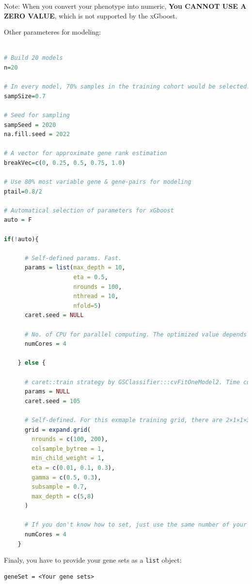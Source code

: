 \documentclass[
  12pt,
]{book}
\newcommand{\passthrough}[1]{#1}
\begin{document}
Note: When you convert your phenotype into numeric, \textbf{You CANNOT USE A ZERO VALUE}, which is not supported by the xGboost.

Other parameteres for modeling:

\begin{lstlisting}[language=R]

# Build 20 models
n=20 

# In every model, 70% samples in the training cohort would be selected. 
sampSize=0.7

# Seed for sampling
sampSeed = 2020
na.fill.seed = 2022

# A vector for approximate gene rank estimation
breakVec=c(0, 0.25, 0.5, 0.75, 1.0)
  
# Use 80% most variable gene & gene-pairs for modeling
ptail=0.8/2

# Automatical selection of parameters for xGboost
auto = F

if(!auto){
      
      # Self-defined params. Fast.
      params = list(max_depth = 10,
                    eta = 0.5,
                    nrounds = 100,
                    nthread = 10,
                    nfold=5)
      caret.seed = NULL
      
      # No. of CPU for parallel computing. The optimized value depends on your CPU and RAM
      numCores = 4
      
    } else {
      
      # caret::train strategy by GSClassifier:::cvFitOneModel2. Time consuming
      params = NULL
      caret.seed = 105
      
      # Self-defined. For this exmaple training grid, there are 2×1×1×3×2×1×2=24 grids. Make sure that you have a computer with a powerfull CPU.
      grid = expand.grid(
        nrounds = c(100, 200),
        colsample_bytree = 1,
        min_child_weight = 1,
        eta = c(0.01, 0.1, 0.3),
        gamma = c(0.5, 0.3),
        subsample = 0.7,
        max_depth = c(5,8)
      )
      
      # If you don't know how to set, just use the same number of your subtypes
      numCores = 4 
    }
\end{lstlisting}

Finaly, you have to provide your gene sets as a \passthrough{\lstinline!list!} object:

\begin{lstlisting}
geneSet = <Your gene sets>
\end{lstlisting}
\end{document}
